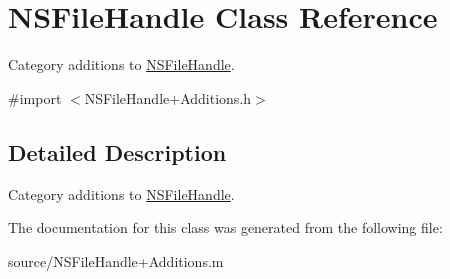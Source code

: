 \hypertarget{class_n_s_file_handle}{
\section{NSFileHandle Class Reference}
\label{class_n_s_file_handle}
}


Category additions to \hyperlink{class_n_s_file_handle}{NSFileHandle}.  


{\ttfamily \#import $<$NSFileHandle+Additions.h$>$}

\subsection{Detailed Description}
Category additions to \hyperlink{class_n_s_file_handle}{NSFileHandle}. 

The documentation for this class was generated from the following file:\begin{DoxyCompactItemize}
\item 
source/NSFileHandle+Additions.m\end{DoxyCompactItemize}
